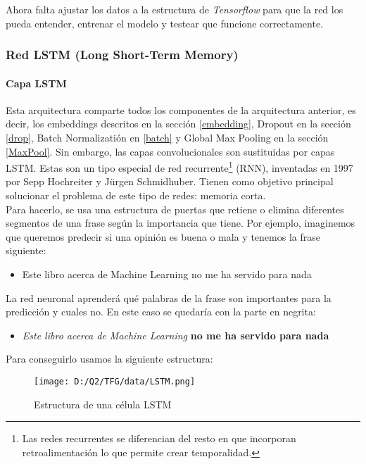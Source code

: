 \documentclass[10pt,riqno,a4paper,twoside]{article}\usepackage[]{graphicx}\usepackage[]{color}
\begin{document}
Ahora falta ajustar los datos a la estructura de \textit{Tensorflow} para que la red los pueda entender, entrenar el modelo y testear que funcione correctamente. 


\subsubsection{Red LSTM (Long Short-Term Memory)}

\paragraph{Capa LSTM}

Esta arquitectura comparte todos los componentes de la arquitectura anterior, es decir, los embeddings descritos en la sección \ref{embedding}, Dropout en la sección \ref{drop}, Batch Normalizatión en \ref{batch} y Global Max Pooling en la sección \ref{MaxPool}. Sin embargo, las capas convolucionales son sustituidas por capas LSTM. Estas son un tipo especial de red recurrente\footnote{Las redes recurrentes se diferencian del resto en que incorporan retroalimentación lo que permite crear temporalidad.} (RNN), inventadas en 1997 por Sepp Hochreiter y Jürgen Schmidhuber. Tienen como objetivo principal solucionar el problema de este tipo de redes: memoria corta.\\

Para hacerlo, se usa una estructura de puertas que retiene o elimina diferentes segmentos de una frase según la importancia que tiene. Por ejemplo, imaginemos que queremos predecir si una opinión es buena o mala y tenemos la frase siguiente:

\begin{itemize}
\item{Este libro acerca de Machine Learning no me ha servido para nada}
\end{itemize} 

La red neuronal aprenderá qué palabras de la frase son importantes para la predicción y cuales no. En este caso se quedaría con la parte en negrita:

\begin{itemize}
\item{\textit{Este libro acerca de Machine Learning} \textbf{no me ha servido para nada}}
\end{itemize} 

Para conseguirlo usamos la siguiente estructura:\\


\begin{figure}[h]
\begin{center}
  \caption{Estructura de una célula LSTM}
\texttt{[image: D:/Q2/TFG/data/LSTM.png]}
\end{center}
\end{figure}
\end{document}
